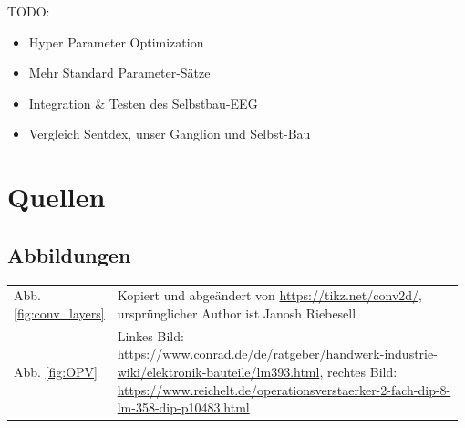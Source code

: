 \documentclass[10pt]{article}
\begin{document}
TODO:
\begin{itemize}
    \item Hyper Parameter Optimization
    \item Mehr Standard Parameter-Sätze
    \item Integration \& Testen des Selbstbau-EEG
    \item Vergleich Sentdex, unser Ganglion und Selbst-Bau
\end{itemize}

\section{Quellen}
\subsection{Abbildungen}
\begin{table}[h!]
    \renewcommand*{\arraystretch}{1.2}
    \centering
    {
    \setlength{\tabcolsep}{0pt}
    \begin{tabular}{p{0.08\linewidth}p{0.9\linewidth}}
        Abb. \ref{fig:conv_layers} %
        & Kopiert und abgeändert von \href{https://tikz.net/conv2d/}{https://tikz.net/conv2d/}, ursprünglicher Author ist Janosh Riebesell  \\
        Abb. \ref{fig:OPV} %
        & Linkes Bild: \href{https://www.conrad.de/de/ratgeber/handwerk-industrie-wiki/elektronik-bauteile/lm393.html}{https://www.conrad.de/de/ratgeber/handwerk-industrie-wiki/elektronik-bauteile/lm393.html}, rechtes Bild: \href{https://www.reichelt.de/operationsverstaerker-2-fach-dip-8-lm-358-dip-p10483.html}{https://www.reichelt.de/operationsverstaerker-2-fach-dip-8-lm-358-dip-p10483.html} \\
    \end{tabular}
    }
    \label{tab:my_label}
\end{table}
\printbibliography[title={Literatur}, keyword={Literatur}]
\printbibliography[title={Anderes}, notkeyword={Literatur}]
\end{document}

